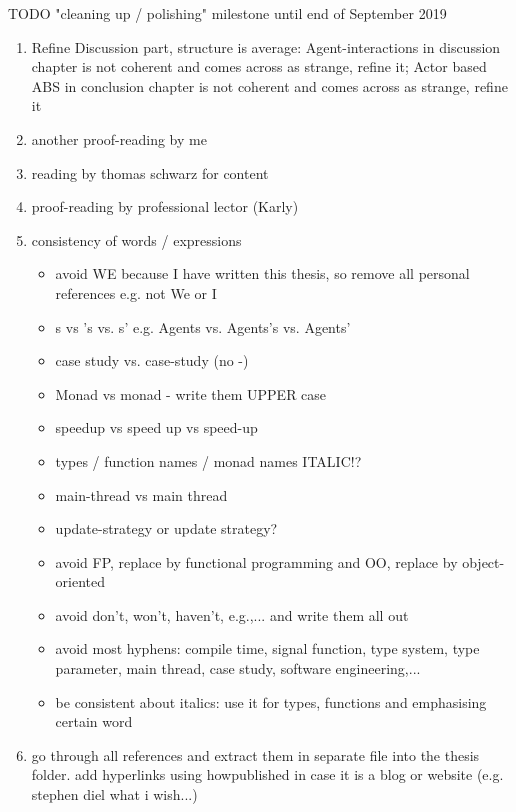\documentclass[oneside]{book}
\begin{document}
TODO "cleaning up / polishing" milestone until end of September 2019
\begin{enumerate}
	\item Refine Discussion part, structure is average: Agent-interactions in discussion chapter is not coherent and comes across as strange, refine it; Actor based ABS in conclusion chapter is not coherent and comes across as strange, refine it

	\item another proof-reading by me	
	
	\item reading by thomas schwarz for content
		
	\item proof-reading by professional lector (Karly)

	\item consistency of words / expressions
		\begin{itemize}
			\item avoid WE because I have written this thesis, so remove all personal references e.g. not We or I
			\item s vs 's vs. s' e.g. Agents vs. Agents's vs. Agents'
			\item case study vs. case-study (no -)
			\item Monad vs monad - write them UPPER case
			\item speedup vs speed up vs speed-up
			\item types / function names / monad names ITALIC!?
			\item main-thread vs main thread
			\item update-strategy or update strategy?
			\item avoid FP, replace by functional programming and OO, replace by object-oriented
			\item avoid don't, won't, haven't, e.g.,... and write them all out
			\item avoid most hyphens: compile time, signal function, type system, type parameter, main thread, case study, software engineering,...
			\item be consistent about italics: use it for types, functions and emphasising certain word
		\end{itemize}
		
	\item go through all references and extract them in separate file into the thesis folder. add hyperlinks using howpublished in case it is a blog or website (e.g. stephen diel what i wish...)
	

\end{enumerate}
\end{document}
